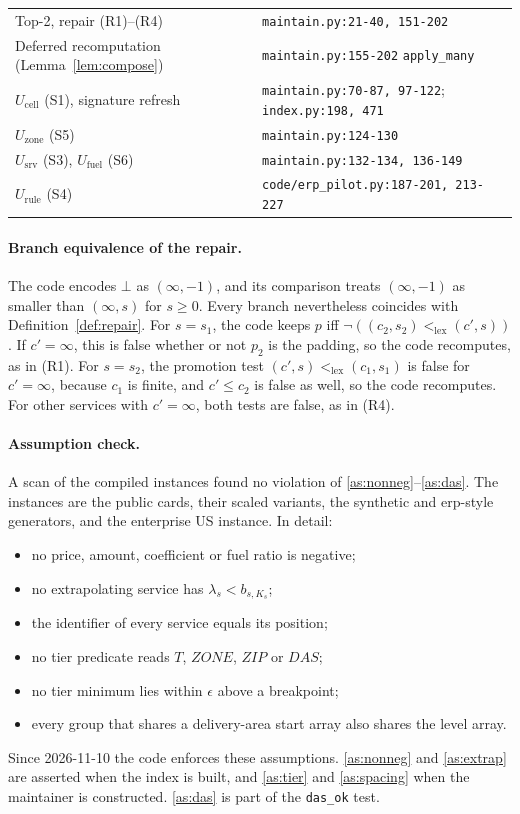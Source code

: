 \documentclass[11pt]{article}
\theoremstyle{definition}
\theoremstyle{remark}
\newcommand{\lexlt}{\mathrel{<_{\mathrm{lex}}}}
\newcommand{\code}[1]{\texttt{#1}}
\begin{document}
\begin{longtable}{>{\raggedright\arraybackslash}p{}>{\raggedright\arraybackslash}p{}}
Top-2, repair (R1)--(R4) & \code{maintain.py:21-40, 151-202} \\
Deferred recomputation (Lemma~\ref{lem:compose}) & \code{maintain.py:155-202} \code{apply\_many} \\
$U_{\mathrm{cell}}$ (S1), signature refresh & \code{maintain.py:70-87, 97-122}; \code{index.py:198, 471} \\
$U_{\mathrm{zone}}$ (S5) & \code{maintain.py:124-130} \\
$U_{\mathrm{srv}}$ (S3), $U_{\mathrm{fuel}}$ (S6) & \code{maintain.py:132-134, 136-149} \\
$U_{\mathrm{rule}}$ (S4) & \code{code/erp\_pilot.py:187-201, 213-227} \\
\bottomrule
\end{longtable}

\paragraph{Branch equivalence of the repair.} The code encodes $\bot$ as $(\infty,-1)$, and its
comparison treats $(\infty,-1)$ as smaller than $(\infty,s)$ for $s\ge0$. Every branch
nevertheless coincides with Definition~\ref{def:repair}. For $s=s_1$, the code keeps $p$ iff
$\neg((c_2,s_2)\lexlt(c',s))$. If $c'=\infty$, this is false whether or not $p_2$ is the
padding, so the code recomputes, as in (R1). For $s=s_2$, the promotion test
$(c',s)\lexlt(c_1,s_1)$ is false for $c'=\infty$, because $c_1$ is finite, and
$c'\le c_2$ is false as well, so the code recomputes. For other services with $c'=\infty$,
both tests are false, as in (R4).

\paragraph{Assumption check.} A scan of the compiled instances found no violation of
\ref{as:nonneg}--\ref{as:das}. The instances are the public cards, their scaled variants,
the synthetic and erp-style generators, and the enterprise US instance. In detail:
\begin{itemize}[leftmargin=*]
\item no price, amount, coefficient or fuel ratio is negative;
\item no extrapolating service has $\lambda_s<b_{s,K_s}$;
\item the identifier of every service equals its position;
\item no tier predicate reads $T$, $\mathit{ZONE}$, $\mathit{ZIP}$ or $\mathit{DAS}$;
\item no tier minimum lies within $\epsilon$ above a breakpoint;
\item every group that shares a delivery-area start array also shares the level array.
\end{itemize}
Since 2026-11-10 the code enforces these assumptions. \ref{as:nonneg} and \ref{as:extrap}
are asserted when the index is built, and \ref{as:tier} and \ref{as:spacing} when the
maintainer is constructed. \ref{as:das} is part of the \code{das\_ok} test.
\end{document}
